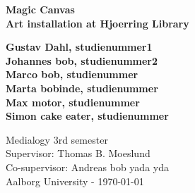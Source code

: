 \thispagestyle{empty} %
\hspace{6cm} \vspace{6cm}
\begin{center}
\textbf{\Huge {Magic Canvas}\\ \vspace{1cm}
\huge{Art installation at Hjoerring Library}}
\end{center}
\vspace{1cm}
\begin{center}
\Large{\textbf{Gustav Dahl, studienummer1 \\ Johannes bob, studienummer2
\\ Marco bob, studienummer \\ Marta bobinde, studienummer \\ Max motor, studienummer
\\ Simon cake eater, studienummer}}
\end{center}
\vfill
Medialogy 3rd semester\\
Supervisor: Thomas B. Moeslund\\
Co-supervisor: Andreas bob yada yda\\
Aalborg University - \today
\thispagestyle{empty}
\setcounter{page}{0}